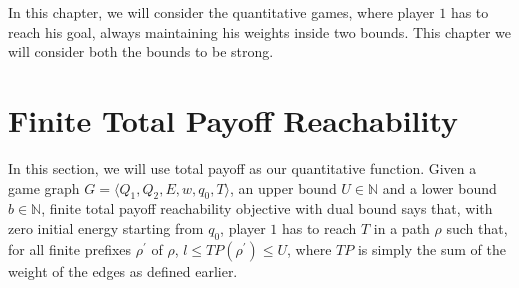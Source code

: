 In this chapter, we will consider the quantitative games, where player $1$ has to reach his goal, always maintaining his weights inside two bounds. This chapter we will consider both the bounds to be strong.

\section{Finite Total Payoff Reachability}

In this section, we will use total payoff as our quantitative function. Given a game graph $G=\langle Q_1, Q_2, E, w, q_0, T \rangle$, an upper bound $U \in \mathbb{N}$ and a lower bound $b \in \mathbb{N}$, finite total payoff reachability objective with dual bound says that, with zero initial energy starting from $q_0$, player $1$ has to reach $T$ in a path $\rho$ such that, for all finite prefixes $\rho^{\prime}$ of $\rho$, $l\leq TP(\rho^{\prime})\leq U$, where $TP$ is simply the sum of the weight of the edges as defined earlier.